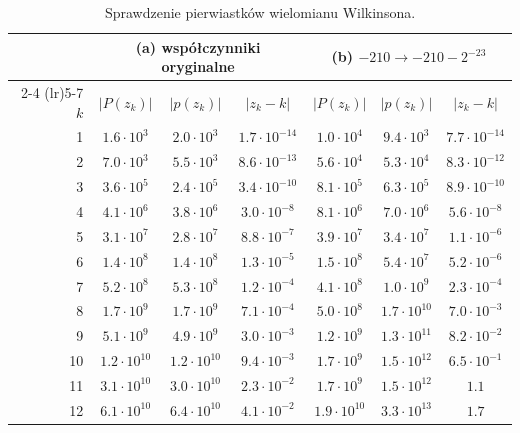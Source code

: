 \documentclass[11pt,a4paper]{article}
\begin{document}
\begin{table}[H]
\centering
\footnotesize
\caption{Sprawdzenie pierwiastków wielomianu Wilkinsona.}
\begin{tabular}{rcccccc}
\toprule
 & \multicolumn{3}{c}{\textbf{(a) współczynniki oryginalne}} & \multicolumn{3}{c}{\textbf{(b) $-210 \to -210 - 2^{-23}$}} \\
\cmidrule(lr){2-4} \cmidrule(lr){5-7}
$k$ & $|P(z_k)|$ & $|p(z_k)|$ & $|z_k - k|$ & $|P(z_k)|$ & $|p(z_k)|$ & $|z_k - k|$ \\
\midrule
1 & $1.6 \cdot 10^{3}$ & $2.0 \cdot 10^{3}$ & $1.7 \cdot 10^{-14}$ & $1.0 \cdot 10^{4}$ & $9.4 \cdot 10^{3}$ & $7.7 \cdot 10^{-14}$ \\
2 & $7.0 \cdot 10^{3}$ & $5.5 \cdot 10^{3}$ & $8.6 \cdot 10^{-13}$ & $5.6 \cdot 10^{4}$ & $5.3 \cdot 10^{4}$ & $8.3 \cdot 10^{-12}$ \\
3 & $3.6 \cdot 10^{5}$ & $2.4 \cdot 10^{5}$ & $3.4 \cdot 10^{-10}$ & $8.1 \cdot 10^{5}$ & $6.3 \cdot 10^{5}$ & $8.9 \cdot 10^{-10}$ \\
4 & $4.1 \cdot 10^{6}$ & $3.8 \cdot 10^{6}$ & $3.0 \cdot 10^{-8}$ & $8.1 \cdot 10^{6}$ & $7.0 \cdot 10^{6}$ & $5.6 \cdot 10^{-8}$ \\
5 & $3.1 \cdot 10^{7}$ & $2.8 \cdot 10^{7}$ & $8.8 \cdot 10^{-7}$ & $3.9 \cdot 10^{7}$ & $3.4 \cdot 10^{7}$ & $1.1 \cdot 10^{-6}$ \\
6 & $1.4 \cdot 10^{8}$ & $1.4 \cdot 10^{8}$ & $1.3 \cdot 10^{-5}$ & $1.5 \cdot 10^{8}$ & $5.4 \cdot 10^{7}$ & $5.2 \cdot 10^{-6}$ \\
7 & $5.2 \cdot 10^{8}$ & $5.3 \cdot 10^{8}$ & $1.2 \cdot 10^{-4}$ & $4.1 \cdot 10^{8}$ & $1.0 \cdot 10^{9}$ & $2.3 \cdot 10^{-4}$ \\
8 & $1.7 \cdot 10^{9}$ & $1.7 \cdot 10^{9}$ & $7.1 \cdot 10^{-4}$ & $5.0 \cdot 10^{8}$ & $1.7 \cdot 10^{10}$ & $7.0 \cdot 10^{-3}$ \\
9 & $5.1 \cdot 10^{9}$ & $4.9 \cdot 10^{9}$ & $3.0 \cdot 10^{-3}$ & $1.2 \cdot 10^{9}$ & $1.3 \cdot 10^{11}$ & $8.2 \cdot 10^{-2}$ \\
10 & $1.2 \cdot 10^{10}$ & $1.2 \cdot 10^{10}$ & $9.4 \cdot 10^{-3}$ & $1.7 \cdot 10^{9}$ & $1.5 \cdot 10^{12}$ & $6.5 \cdot 10^{-1}$ \\
11 & $3.1 \cdot 10^{10}$ & $3.0 \cdot 10^{10}$ & $2.3 \cdot 10^{-2}$ & $1.7 \cdot 10^{9}$ & $1.5 \cdot 10^{12}$ & $1.1$ \\
12 & $6.1 \cdot 10^{10}$ & $6.4 \cdot 10^{10}$ & $4.1 \cdot 10^{-2}$ & $1.9 \cdot 10^{10}$ & $3.3 \cdot 10^{13}$ & $1.7$ \\

\end{tabular}
\end{table}
\end{document}
